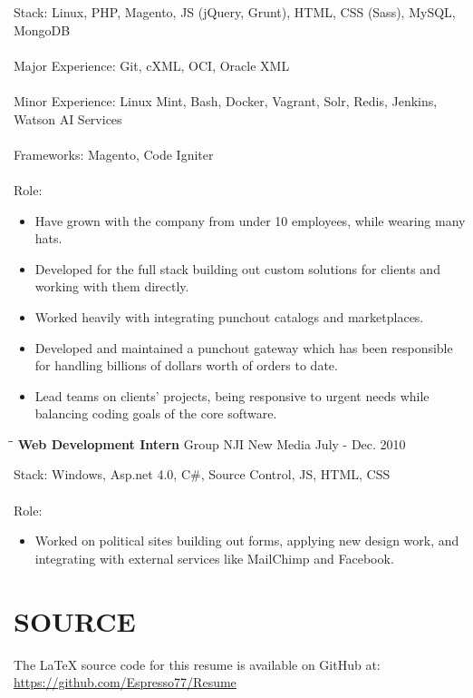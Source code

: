 \documentclass{res}
\begin{document}
\begin{resume}
    Stack: Linux, PHP, Magento, JS (jQuery, Grunt), HTML, CSS (Sass), MySQL, MongoDB \\
	\\
	Major Experience: Git, cXML, OCI, Oracle XML \\
	\\
	Minor Experience: Linux Mint, Bash, Docker, Vagrant, Solr, Redis, Jenkins, Watson AI Services \\
	\\
	Frameworks: Magento, Code Igniter \\
	\\
	Role: \\
	\vspace{-0.15in}	
	\begin{itemize}
		\item Have grown with the company from under 10 employees, while wearing many hats.
		\item Developed for the full stack building out custom solutions for clients and working with them directly.
		\item Worked heavily with integrating punchout catalogs and marketplaces.
		\item Developed and maintained a punchout gateway which has been responsible for handling billions of dollars worth of orders to date.
		\item Lead teams on clients' projects, being responsive to urgent needs while balancing coding goals of the core software.
	\end{itemize}
    
   \begin{tabbing}
		\hspace{2.3in}\= \hspace{2.6in}\= \kill %
		\textbf{Web Development Intern} \>Group NJI New Media \> July - Dec. 2010 \\
   \end{tabbing}\vspace{-20pt}
   
    Stack: Windows, Asp.net 4.0, C\#, Source Control, JS, HTML, CSS \\
	\\
	Role: \\
	\vspace{-0.15in}
	\begin{itemize}
		\item Worked on political sites building out forms, applying new design work, and integrating with external services like MailChimp and Facebook.
	\end{itemize}
	
\section{SOURCE}
	The LaTeX source code for this resume is available on GitHub at: \\
	\url{https://github.com/Espresso77/Resume}
 
\end{resume}
\end{document}
